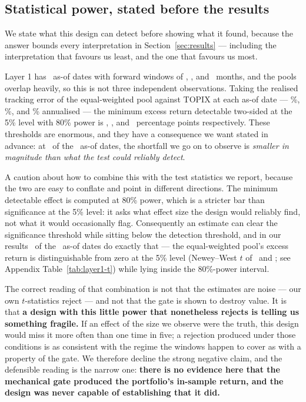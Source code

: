 \documentclass[a4paper,11pt]{article}
\begin{document}
\subsection{Statistical power, stated before the results}\label{sec:power}

We state what this design can detect before showing what it found, because the answer bounds every
interpretation in Section~\ref{sec:results} --- including the interpretation that favours us least,
and the one that favours us most.

Layer 1 has \LoneNasof\ as-of dates with forward windows of \LoneAMonths, \LoneBMonths, and
\LoneCMonths\ months, and the pools overlap heavily, so this is not three independent
observations. Taking the realised tracking error of the equal-weighted pool against TOPIX at each
as-of date --- \MdeATe\%, \MdeBTe\%, and \MdeCTe\% annualised --- the minimum excess return
detectable two-sided at the 5\% level with 80\% power is \MdeA, \MdeB, and \MdeC\ percentage points
respectively. These thresholds are enormous, and they have a consequence we want stated in advance:
at \MdeNotDetectable\ of the \MdeTotal\ as-of dates, the shortfall we go on to observe is
\emph{smaller in magnitude than what the test could reliably detect}.

A caution about how to combine this with the test statistics we report, because the two are easy to
conflate and point in different directions. The minimum detectable effect is computed at 80\% power,
which is a stricter bar than significance at the 5\% level: it asks what effect size the design would
reliably find, not what it would occasionally flag. Consequently an estimate can clear the
significance threshold while sitting below the detection threshold, and in our results
\LoneRejectFive\ of the \MdeTotal\ as-of dates do exactly that --- the equal-weighted pool's excess
return is distinguishable from zero at the 5\% level (Newey--West $t$ of \LoneAPoolT\ and
\LoneCPoolT; see Appendix Table~\ref{tab:layer1-t}) while lying inside the 80\%-power interval.

The correct reading of that combination is not that the estimates are noise --- our own $t$-statistics
reject --- and not that the gate is shown to destroy value. It is that \textbf{a design with this
little power that nonetheless rejects is telling us something fragile.} If an effect of the size we
observe were the truth, this design would miss it more often than one time in five; a rejection
produced under those conditions is as consistent with the regime the windows happen to cover as with
a property of the gate. We therefore decline the strong negative claim, and the defensible reading is
the narrow one: \textbf{there is no evidence here that the mechanical gate produced the portfolio's
in-sample return, and the design was never capable of establishing that it did.}
\end{document}
